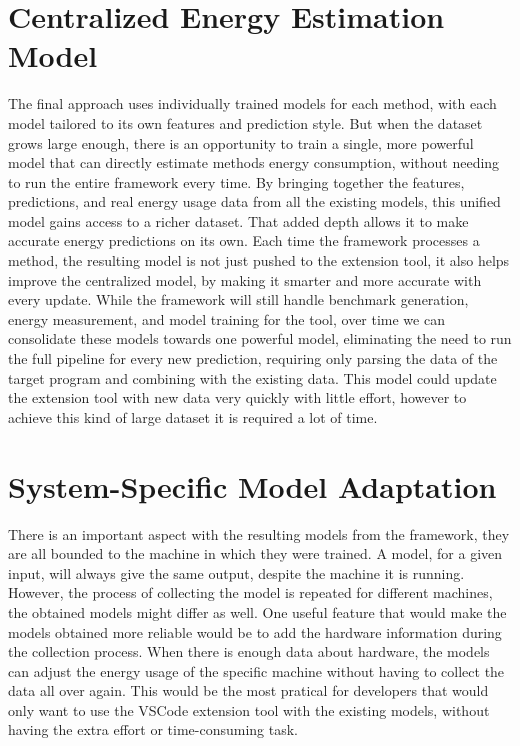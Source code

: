 \section{Centralized Energy Estimation Model} \label{sec:future_work_centralized_energy_estimation_model}

The final approach uses individually trained models for each method, with each model tailored to its own features and prediction style. But when the dataset grows large enough, there is an opportunity to train a single, more powerful model that can directly estimate methods energy consumption, without needing to run the entire framework every time.
By bringing together the features, predictions, and real energy usage data from all the existing models, this unified model gains access to a richer dataset. That added depth allows it to make accurate energy predictions on its own. Each time the framework processes a method, the resulting model is not just pushed to the extension tool, it also helps improve the centralized model, by making it smarter and more accurate with every update.
While the framework will still handle benchmark generation, energy measurement, and model training for the tool, over time we can consolidate these models towards one powerful model, eliminating the need to run the full pipeline for every new prediction, requiring only parsing the data of the target program and combining with the existing data.
This model could update the extension tool with new data very quickly with little effort, however to achieve this kind of large dataset it is required a lot of time.


\section{System-Specific Model Adaptation} \label{sec:future_system_specific_model_adaptation}

There is an important aspect with the resulting models from the framework, they are all bounded to the machine in which they were trained. A model, for a given input, will always give the same output, despite the machine it is running. However, the process of collecting the model is repeated for different machines, the obtained models might differ as well. One useful feature that would make the models obtained more reliable would be to add the hardware information during the collection process. When there is enough data about hardware, the models can adjust the energy usage of the specific machine without having to collect the data all over again. This would be the most pratical for developers that would only want to use the VSCode extension tool with the existing models, without having the extra effort or time-consuming task.














